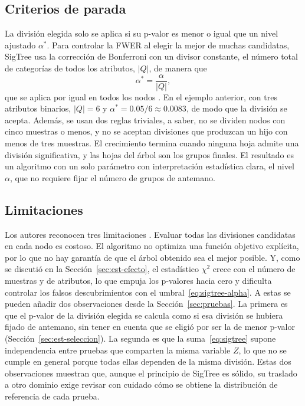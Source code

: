 \subsection{Criterios de parada}

La división elegida solo se aplica si su p-valor es menor o igual que un nivel
ajustado $\alpha^\ast$. Para controlar la FWER al elegir la mejor de muchas
candidatas, SigTree usa la corrección de Bonferroni con un divisor constante,
el número total de categorías de todos los atributos, $|Q|$, de manera que
\begin{equation}\label{eq:sigtree-alpha}
  \alpha^\ast = \frac{\alpha}{|Q|} ,
\end{equation}
que se aplica por igual en todos los nodos \cite[Sec.~3.4]{Hu2025}. En el ejemplo anterior, con tres atributos binarios, $|Q| = 6$ y $\alpha^\ast = 0.05/6 \approx 0.0083$, de modo que la división se acepta. Además, se
usan dos reglas triviales, a saber, no se dividen nodos con cinco muestras o menos, y no se
aceptan divisiones que produzcan un hijo con menos de tres muestras. El
crecimiento termina cuando ninguna hoja admite una división significativa, y las
hojas del árbol son los grupos finales. El resultado es un algoritmo con un solo
parámetro con interpretación estadística clara, el nivel $\alpha$, que no
requiere fijar el número de grupos de antemano.

\subsection{Limitaciones}

Los autores reconocen tres limitaciones \cite[Sec.~5]{Hu2025}. Evaluar todas las
divisiones candidatas en cada nodo es costoso. El algoritmo no optimiza una
función objetivo explícita, por lo que no hay garantía de que el árbol obtenido
sea el mejor posible. Y, como se discutió en la Sección~\ref{sec:est-efecto}, el
estadístico $\chi^2$ crece con el número de muestras y de atributos, lo que empuja
los p-valores hacia cero y dificulta controlar los falsos descubrimientos con el
umbral~\eqref{eq:sigtree-alpha}. A estas se pueden añadir dos observaciones desde
la Sección~\ref{sec:pruebas}. La primera es que el p-valor de la división elegida
se calcula como si esa división se hubiera fijado de antemano, sin tener en cuenta
que se eligió por ser la de menor p-valor (Sección~\ref{sec:est-seleccion}). La
segunda es que la suma~\eqref{eq:sigtree} supone independencia entre pruebas que
comparten la misma variable $Z$, lo que no se cumple en general porque todas ellas
dependen de la misma división. Estas dos observaciones muestran que, aunque el
principio de SigTree es sólido, su traslado a otro dominio exige revisar con
cuidado cómo se obtiene la distribución de referencia de cada prueba.

